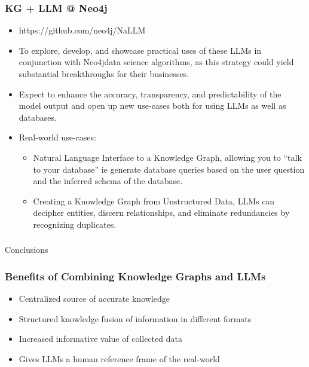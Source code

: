 \begin{frame}[fragile]\frametitle{KG + LLM @ Neo4j}
\begin{itemize}
\item https://github.com/neo4j/NaLLM
\item To explore, develop, and showcase practical uses of these LLMs in conjunction with Neo4jdata science algorithms, as this strategy could yield substantial breakthroughs for their businesses.
\item Expect to enhance the accuracy, transparency, and predictability of the model output and open up new use-cases both for using LLMs as well as databases.
\item Real-world use-cases:

	\begin{itemize}
	\item Natural Language Interface to a Knowledge Graph, allowing you to “talk to your database” ie generate database queries based on the user question and the inferred schema of the database.
	\item Creating a Knowledge Graph from Unstructured Data, LLMs can decipher entities, discern relationships, and eliminate redundancies by recognizing duplicates.
	\end{itemize}

\end{itemize}
\end{frame}


\begin{frame}[fragile]\frametitle{}
\begin{center}
{\Large Conclusions}

\end{center}
\end{frame}

\begin{frame}[fragile]\frametitle{Benefits of Combining Knowledge Graphs and LLMs}

\begin{itemize}
\item Centralized source of accurate knowledge
\item Structured knowledge fusion of information in different formats
\item Increased informative value of collected data
\item Gives LLMs a human reference frame of the real-world
\end{itemize}

\end{frame}


